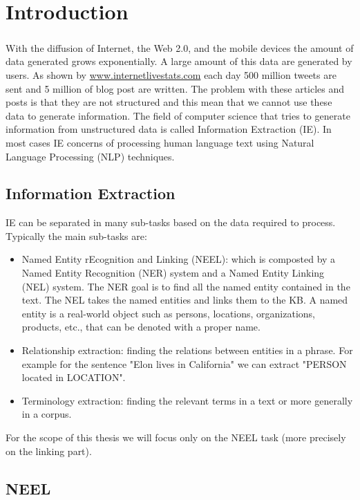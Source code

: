 \chapter{Introduction}
\paragraph{}
With the diffusion of Internet, the Web 2.0, and the mobile devices the amount of data generated grows exponentially. A large amount of this data are generated by users. As shown by \href{http://www.internetlivestats.com/}{www.internetlivestats.com} each day 500 million tweets are sent and 5 million of blog post are written. The problem with these articles and posts is that they are not structured and this mean that we cannot use these data to generate information. The field of computer science that tries to generate information from unstructured data is called Information Extraction (IE). In most cases IE concerns of processing human language text using Natural Language Processing (NLP) techniques.
\section{Information Extraction}
IE can be separated in many sub-tasks based on the data required to process. Typically the main sub-tasks are:
\begin{itemize}[topsep=10pt]
\item Named Entity rEcognition and Linking (NEEL): which is composted by a Named Entity Recognition (NER) system and a Named Entity Linking (NEL) system. The NER goal is to find all the named entity contained in the text. The NEL takes the named entities and links them to the KB. A named entity is a real-world object such as persons, locations, organizations, products, etc., that can be denoted with a proper name.
\item Relationship extraction: finding the relations between entities in a phrase. For example for the sentence "Elon lives in California" we can extract "PERSON located in LOCATION".
\pagebreak
\item Terminology extraction: finding the relevant terms in a text or more generally in a corpus.
\end{itemize}

For the scope of this thesis we will focus only on the NEEL task (more precisely on the linking part).
\section{NEEL}
